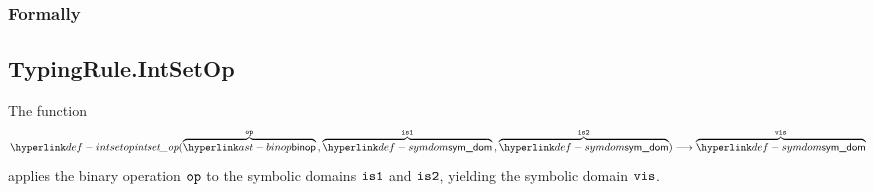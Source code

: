 \subsubsection{Formally}
\begin{mathpar}
\end{mathpar}

\begin{mathpar}
\end{mathpar}

\begin{mathpar}
\end{mathpar}

\subsection{TypingRule.IntSetOp \label{sec:TypingRule.IntSetOp}}
\hypertarget{def-intsetop}{}
The function
\[
\intsetop(\overname{\binop}{\op} \aslsep \overname{\symdom}{\visone} \aslsep \overname{\symdom}{\vistwo})
\aslto \overname{\symdom}{\vis}
\]
applies the binary operation $\op$ to the symbolic domains $\visone$ and $\vistwo$,
yielding the symbolic domain $\vis$.

